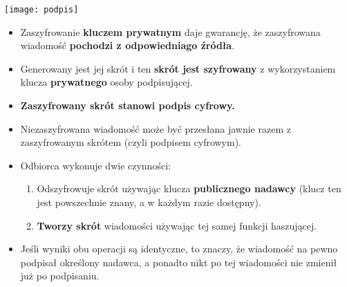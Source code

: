 \documentclass[../sk-egzamin.tex]{subfiles}
\begin{document}

\begin{center}
\texttt{[image: podpis]}
\end{center}

\begin{itemize}
    \item Zaszyfrowanie \textbf{kluczem prywatnym} daje gwarancję,
    że zaszyfrowana wiadomość \textbf{pochodzi z odpowiedniago źródła}.


    \item Generowany jest jej skrót i ten \textbf{skrót jest szyfrowany}
    z wykorzystaniem klucza \textbf{prywatnego} osoby podpisującej.

    \item \textbf{Zaszyfrowany skrót stanowi podpis cyfrowy.}

    \item Niezaszyfrowana wiadomość może być przesłana jawnie razem z
    zaszyfrowanym skrótem (czyli podpisem cyfrowym).

    \item Odbiorca wykonuje dwie czynności:
    \begin{enumerate}
        \item Odszyfrowuje skrót używając klucza \textbf{publicznego nadawcy}
        (klucz ten jest powszechnie znany, a w każdym razie dostępny).

        \item \textbf{Tworzy skrót} wiadomości używając tej samej funkcji
        haszującej.
    \end{enumerate}

    \item Jeśli wyniki obu operacji są identyczne, to znaczy, że wiadomość
    na pewno podpisał określony nadawca, a ponadto nikt po tej wiadomości nie
    zmienił już po podpisaniu.
\end{itemize}



\pagebreak
\end{document}
